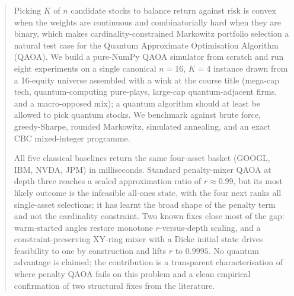 \begin{abstract}
\noindent
Picking $K$ of $n$ candidate stocks to balance return against risk is convex when the weights are continuous and combinatorially hard when they are binary, which makes cardinality-constrained Markowitz portfolio selection a natural test case for the Quantum Approximate Optimisation Algorithm (QAOA). We build a pure-NumPy QAOA simulator from scratch and run eight experiments on a single canonical $n=16$, $K=4$ instance drawn from a 16-equity universe assembled with a wink at the course title (mega-cap tech, quantum-computing pure-plays, large-cap quantum-adjacent firms, and a macro-opposed mix); a quantum algorithm should at least be allowed to pick quantum stocks. We benchmark against brute force, greedy-Sharpe, rounded Markowitz, simulated annealing, and an exact CBC mixed-integer programme.

All five classical baselines return the same four-asset basket (GOOGL, IBM, NVDA, JPM) in milliseconds. Standard penalty-mixer QAOA at depth three reaches a scaled approximation ratio of $r \approx 0.99$, but its most likely outcome is the infeasible all-ones state, with the four next ranks all single-asset selections; it has learnt the broad shape of the penalty term and not the cardinality constraint. Two known fixes close most of the gap: warm-started angles restore monotone $r$-versus-depth scaling, and a constraint-preserving XY-ring mixer with a Dicke initial state drives feasibility to one by construction and lifts $r$ to $0.9995$. No quantum advantage is claimed; the contribution is a transparent characterisation of where penalty QAOA fails on this problem and a clean empirical confirmation of two structural fixes from the literature.
\end{abstract}
